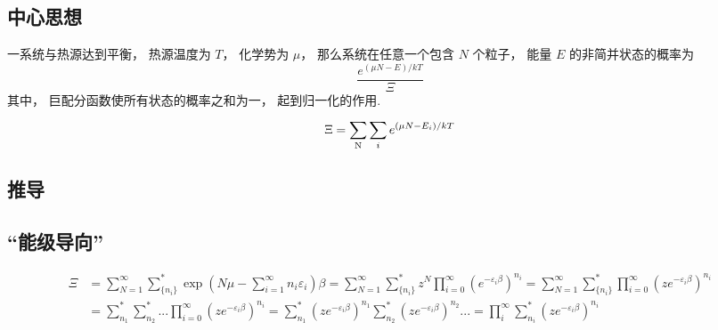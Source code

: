 
\subsection{中心思想}
一系统与热源达到平衡， 热源温度为 $T$，  化学势为 $\mu $，  那么系统在任意一个包含 $N$ 个粒子， 能量 $E$ 的非简并状态的概率为
\begin{equation}
\frac{{{e^{(\mu N - E)/kT}}}}{\Xi }
\end{equation}
其中， 巨配分函数使所有状态的概率之和为一， 起到归一化的作用.
\begin{equation}
\Xi  = \sum\limits_{\rm{N}}^{} {\sum\limits_i^{} {{e^{(\mu N - {E_i})/kT}}} } \end{equation}
\subsection{推导} %

\subsection{“能级导向”}

\begin{equation}
\begin{aligned}
\Xi & = \sum\limits_{N = 1}^\infty  {\sum\limits_{\{ {n_i}\} }^ *  {\exp \left( {N\mu  - \sum\limits_{i = 1}^\infty  {{n_i}{\varepsilon _i}} } \right)\beta } }  = \sum\limits_{N = 1}^\infty  {\sum\limits_{\{ {n_i}\} }^ *  {{z^N}\prod\limits_{i = 0}^\infty  {{{\left( {{e^{ - {\varepsilon _i}\beta }}} \right)}^{{n_i}}}} } }  = \sum\limits_{N = 1}^\infty  {\sum\limits_{\{ {n_i}\} }^ *  {\prod\limits_{i = 0}^\infty  {{{\left( {z{e^{ - {\varepsilon _i}\beta }}} \right)}^{{n_i}}}} } } \\
 &= \sum\limits_{{n_1}}^ *  {\sum\limits_{{n_2}}^ *  {...\prod\limits_{i = 0}^\infty  {{{\left( {z{e^{ - {\varepsilon _i}\beta }}} \right)}^{{n_i}}}} } }  = \sum\limits_{{n_1}}^ *  {{{\left( {z{e^{ - {\varepsilon _i}\beta }}} \right)}^{{n_1}}}} \sum\limits_{{n_2}}^ *  {{{\left( {z{e^{ - {\varepsilon _i}\beta }}} \right)}^{{n_2}}}} ... = \prod\limits_i^\infty  {\sum\limits_{{n_i}}^ *  {{{\left( {z{e^{ - {\varepsilon _i}\beta }}} \right)}^{{n_i}}}} }
\end{aligned}
\end{equation}
